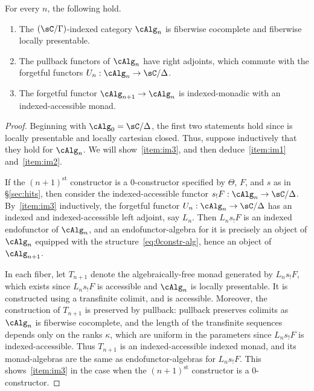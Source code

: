 \documentclass{amsart}
\begin{document}
\begin{lem}\label{thm:monads}
  For every $n$, the following hold.
  \begin{enumerate}
  \item The $(\sC/\Gamma)$-indexed category $\cAlg_{n}$ is fiberwise cocomplete and fiberwise locally presentable.\label{item:im1}
  \item The pullback functors of $\cAlg_{n}$ have right adjoints, which commute with the forgetful functors $U_n:\cAlg_{n} \to \sC/\Delta$.\label{item:im2}
  \item The forgetful functor $\cAlg_{n+1}\to \cAlg_{n}$ is indexed-monadic with an indexed-accessible monad.\label{item:im3}
  \end{enumerate}
\end{lem}
\begin{proof}
  Beginning with $\cAlg_{0} = \sC/\Delta$, the first two statements hold since \sC is locally presentable and locally cartesian closed.
  Thus, suppose inductively that they hold for $\cAlg_{n}$.
  We will show~\ref{item:im3}, and then deduce~\ref{item:im1} and~\ref{item:im2}.

  If the $(n+1)^{\mathrm{st}}$ constructor is a 0-constructor specified by $\Theta$, $F$, and $s$ as in \S\ref{sec:hits}, then consider the indexed-accessible functor $s_! F : \cAlg_{n} \to \sC/\Delta$.
  By~\ref{item:im3} inductively, the forgetful functor $U_n:\cAlg_{n}\to \sC/\Delta$ has an indexed and indexed-accessible left adjoint, say $L_n$.
  Then $L_n s_! F$ is an indexed endofunctor of $\cAlg_{n}$, and an endofunctor-algebra for it is precisely an object of $\cAlg_{n}$ equipped with the structure~\eqref{eq:0constr-alg}, hence an object of $\cAlg_{n+1}$.

  In each fiber, let $T_{n+1}$ denote the algebraically-free monad generated by $L_n s_! F$, which exists since $L_n s_! F$ is accessible and $\cAlg_{n}$ is locally presentable.
  It is constructed using a transfinite colimit, and is accessible.
  Moreover, the construction of $T_{n+1}$ is preserved by pullback: pullback preserves colimits as $\cAlg_n$ is fiberwise cocomplete, and the length of the transfinite sequences depends only on the ranks $\kappa$, which are uniform in the parameters since $L_n s_! F$ is indexed-accessible.
  Thus $T_{n+1}$ is an indexed-accessible indexed monad, and its monad-algebras are the same as endofunctor-algebras for $L_n s_! F$.
  This shows~\ref{item:im3} in the case when the $(n+1)^{\mathrm{st}}$ constructor is a 0-constructor.


\end{proof}
\end{document}
